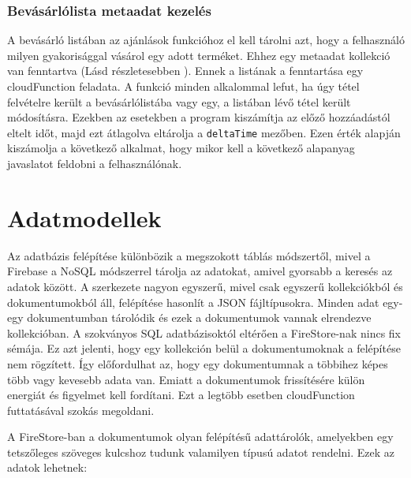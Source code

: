 \documentclass[12pt]{report}
\theoremstyle{definition}
\begin{document}
\subsection{Bevásárlólista metaadat kezelés}

A bevásárló listában az ajánlások funkcióhoz el kell tárolni azt, hogy a felhasználó milyen gyakorisággal vásárol egy adott terméket. 
Ehhez egy metaadat kollekció van fenntartva (Lásd részletesebben ). Ennek a listának a fenntartása egy \gls{cloudFunction} feladata. 
A funkció minden alkalommal lefut, ha úgy tétel felvételre került a bevásárlólistába vagy egy, a listában lévő tétel került módosításra. 
Ezekben az esetekben a program kiszámítja az előző hozzáadástól eltelt időt, majd ezt átlagolva eltárolja a \texttt{deltaTime} mezőben.
Ezen érték alapján kiszámolja a következő alkalmat, hogy mikor kell a következő alapanyag javaslatot feldobni a felhasználónak.



\chapter{Adatmodellek}
\label{dataSchemes}
Az adatbázis felépítése különbözik a megszokott táblás módszertől, mivel a Firebase a NoSQL módszerrel tárolja az adatokat, amivel gyorsabb a keresés az adatok között. A szerkezete nagyon egyszerű, mivel csak egyszerű kollekciókból és dokumentumokból áll, felépítése hasonlít a JSON fájltípusokra. Minden adat egy-egy dokumentumban tárolódik és ezek a dokumentumok vannak elrendezve kollekcióban. A szokványos SQL adatbázisoktól eltérően a FireStore-nak nincs fix sémája. Ez azt jelenti, hogy egy kollekción belül a dokumentumoknak a felépítése nem rögzített. Így előfordulhat az, hogy egy dokumentumnak a többihez képes több vagy kevesebb adata van. Emiatt a dokumentumok frissítésére külön energiát és figyelmet kell fordítani. Ezt a legtöbb esetben \gls{cloudFunction} futtatásával szokás megoldani.

A FireStore-ban a dokumentumok olyan felépítésű adattárolók, amelyekben egy tetszőleges szöveges kulcshoz tudunk valamilyen típusú adatot rendelni. Ezek az adatok lehetnek: 
\end{document}
